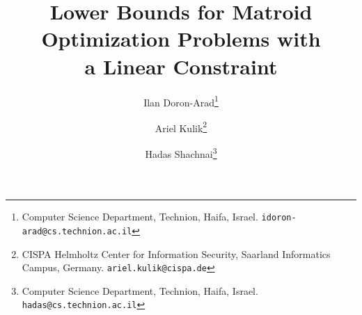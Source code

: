 \documentclass[11pt,letter]{article}
\begin{document}
	
	
	
		\title{
			  Lower Bounds for Matroid Optimization Problems with \\ a Linear Constraint
		}
		
		\author{Ilan Doron-Arad\thanks{Computer Science Department, 
				Technion, Haifa, Israel. \texttt{idoron-arad@cs.technion.ac.il}}
			\and
			Ariel Kulik\thanks{CISPA Helmholtz Center for Information Security, Saarland Informatics Campus, Germany. \texttt{ariel.kulik@cispa.de}} 
			\and
			Hadas Shachnai\thanks{Computer Science Department, 
				Technion, Haifa, Israel. \texttt{hadas@cs.technion.ac.il}}
		}
%				
		\maketitle
		\thispagestyle{empty}
		
		\begin{abstract}
			
		\end{abstract}
		
		\newpage

		\setcounter{page}{1}
		
		

		
		
				
%		

		
   		    
	
%		  

%		  
		 
	



	
	


%
		
		
		\appendix
		
	
\end{document}
